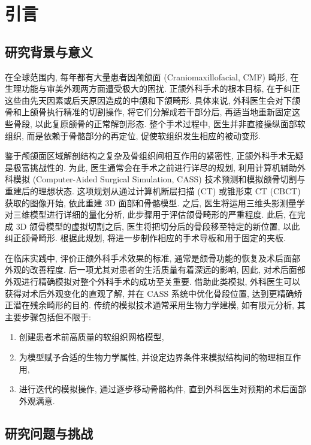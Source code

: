 \chapter{引言}

\section{研究背景与意义}

在全球范围内, 每年都有大量患者因颅颌面 (Craniomaxillofacial, CMF) 畸形, 在生理功能与审美外观两方面遭受极大的困扰.
正颌外科手术的根本目标, 在于纠正这些由先天因素或后天原因造成的中颌和下颌畸形.
具体来说, 外科医生会对下颌骨和上颌骨执行精准的切割操作, 将它们分解成若干部分后, 再适当地重新固定这些骨段, 以此复原颌骨的正常解剖形态.
整个手术过程中, 医生并非直接操纵面部软组织, 而是依赖于骨骼部分的再定位, 促使软组织发生相应的被动变形.

鉴于颅颌面区域解剖结构之复杂及骨组织间相互作用的紧密性, 正颌外科手术无疑是极富挑战性的.
为此, 医生通常会在手术之前进行详尽的规划, 利用计算机辅助外科模拟 (Computer-Aided Surgical Simulation, CASS) 技术预测和模拟颌骨切割与重建后的理想状态.
这项规划从通过计算机断层扫描 (CT) 或锥形束 CT (CBCT) 获取的图像开始, 依此重建 3D 面部和骨骼模型.
之后, 医生将运用三维头影测量学对三维模型进行详细的量化分析, 此步骤用于评估颌骨畸形的严重程度.
此后, 在完成 3D 颌骨模型的虚拟切割之后, 医生将把切分后的骨段移至特定的新位置, 以此纠正颌骨畸形.
根据此规划, 将进一步制作相应的手术导板和用于固定的夹板.

在临床实践中, 评价正颌外科手术效果的标准, 通常是颌骨功能的恢复及术后面部外观的改善程度.
后一项尤其对患者的生活质量有着深远的影响, 因此, 对术后面部外观进行精确模拟对整个外科手术的成功至关重要.
借助此类模拟, 外科医生可以获得对术后外观变化的直观了解, 并在 CASS 系统中优化骨段位置, 达到更精确矫正潜在残余畸形的目的.
传统的模拟技术通常采用生物力学建模, 如有限元分析, 其主要步骤包括但不限于:

\begin{enumerate}
  \item 创建患者术前高质量的软组织网格模型,
  \item 为模型赋予合适的生物力学属性, 并设定边界条件来模拟结构间的物理相互作用,
  \item 进行迭代的模拟操作, 通过逐步移动骨骼构件, 直到外科医生对预期的术后面部外观满意.
\end{enumerate}

\section{研究问题与挑战}

